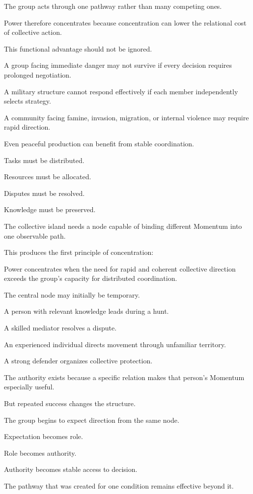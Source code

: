 The group acts through one pathway rather than many competing ones.

Power therefore concentrates because concentration can lower the relational cost of collective action.

This functional advantage should not be ignored.

A group facing immediate danger may not survive if every decision requires prolonged negotiation.

A military structure cannot respond effectively if each member independently selects strategy.

A community facing famine, invasion, migration, or internal violence may require rapid direction.

Even peaceful production can benefit from stable coordination.

Tasks must be distributed.

Resources must be allocated.

Disputes must be resolved.

Knowledge must be preserved.

The collective island needs a node capable of binding different Momentum into one observable path.

This produces the first principle of concentration:

Power concentrates when the need for rapid and coherent collective direction exceeds the group’s capacity for distributed coordination.

The central node may initially be temporary.

A person with relevant knowledge leads during a hunt.

A skilled mediator resolves a dispute.

An experienced individual directs movement through unfamiliar territory.

A strong defender organizes collective protection.

The authority exists because a specific relation makes that person’s Momentum especially useful.

But repeated success changes the structure.

The group begins to expect direction from the same node.

Expectation becomes role.

Role becomes authority.

Authority becomes stable access to decision.

The pathway that was created for one condition remains effective beyond it.

